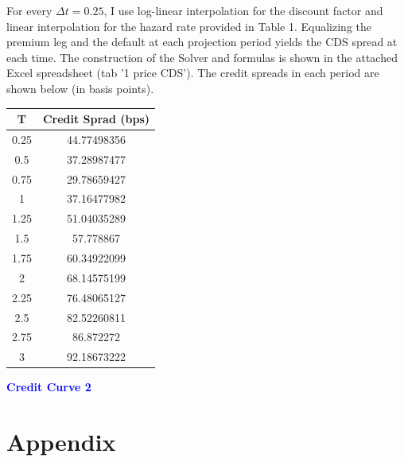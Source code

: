 \documentclass[a4paper,11pt] {article}
\begin{document}
For every $\Delta t= 0.25$, I use log-linear interpolation for the discount factor and linear interpolation for the hazard rate provided in Table 1. Equalizing the premium leg and the default at each projection period yields the CDS spread at each time. The construction of the Solver and formulas is shown in the attached Excel spreadsheet (tab '1 price CDS'). The credit spreads in each period are shown below (in basis points). 

\begin{center}
\begin{tabular}{|c|c|}
  \hline
T	&	Credit Sprad (bps)	\\ \hline
0.25	&	44.77498356	\\
0.5	&	37.28987477	\\
0.75	&	29.78659427	\\
1	&	37.16477982	\\
1.25	&	51.04035289	\\
1.5	&	57.778867	\\
1.75	&	60.34922099	\\
2	&	68.14575199	\\
2.25	&	76.48065127	\\
2.5	&	82.52260811	\\
2.75	&	86.872272	\\
3	&	92.18673222	\\
  \hline
\end{tabular}
\end{center}

\bigskip

\textcolor{blue}{\bf Credit Curve 2} 

\section*{Appendix}
\begin{spacing}{0.9}






\end{spacing}
\end{document}
